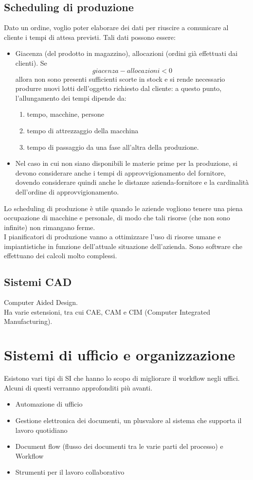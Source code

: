 \subsection{Scheduling di produzione}
\label{sub:Scheduling di produzione}
Dato un ordine, voglio poter elaborare dei dati per riuscire a comunicare al cliente i tempi di attesa previsti. Tali dati possono essere:
\begin{itemize}
  \item Giacenza (del prodotto in magazzino), allocazioni (ordini gi\`a effettuati dai clienti).
  Se 
  $$
   giacenza - allocazioni < 0
  $$
  allora non sono presenti sufficienti scorte in stock e si rende necessario produrre nuovi lotti dell'oggetto richiesto dal cliente: a questo punto, l'allungamento dei tempi dipende da:
  \begin{enumerate}
    \item tempo, macchine, persone
    \item tempo di attrezzaggio della macchina
    \item tempo di passaggio da una fase all'altra della produzione.
  \end{enumerate}
  \item
  Nel caso in cui non siano disponibili le materie prime per la produzione, si devono considerare anche i tempi di approvvigionamento del fornitore, dovendo considerare quindi anche le distanze azienda-fornitore e la cardinalit\`a dell'ordine di approvvigionamento.
\end{itemize}
Lo scheduling di produzione \`e utile quando le aziende vogliono tenere una piena occupazione
di macchine e personale, di modo che tali risorse (che non sono infinite) non rimangano ferme.\\
I pianificatori di produzione vanno a ottimizzare l'uso di risorse umane e impiantistiche in funzione
dell'attuale situazione dell'azienda. Sono software che effettuano dei calcoli molto complessi.
\subsection{Sistemi CAD}
\label{sub:Sistemi CAD}
Computer Aided Design.\\
Ha varie estensioni, tra cui CAE, CAM e CIM (Computer Integrated Manufacturing).
\section{Sistemi di ufficio e organizzazione}
\label{sec:Sistemi di ufficio e organizzazione}
Esistono vari tipi di SI che hanno lo scopo di migliorare il workflow negli uffici. Alcuni di questi verranno approfonditi pi\`u avanti.
\begin{itemize}
  \item Automazione di ufficio
  \item Gestione elettronica dei documenti, un plusvalore al sistema che supporta il lavoro quotidiano
  \item Document flow (flusso dei documenti tra le varie parti del processo) e Workflow
  \item Strumenti per il lavoro collaborativo
\end{itemize}
